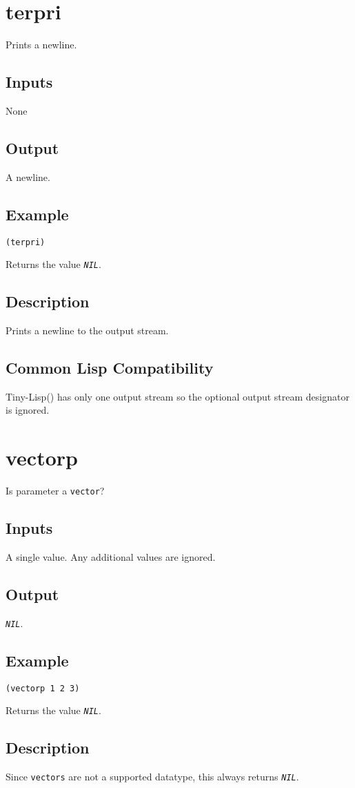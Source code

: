 \documentclass[10pt, openany]{book}
\newcommand{\constant}[1]{\emph{\texttt{#1}}}
\newcommand{\datatype}[1]{\texttt{#1}}
\newcommand{\tl}{Tiny-Lisp}
\begin{document}
\section{terpri}
Prints a newline.
\subsection{Inputs}
None
\subsection{Output}
A newline.
\subsection{Example}
\begin{lstlisting}
(terpri)
\end{lstlisting}
Returns the value \constant{NIL}.
\subsection{Description}
Prints a newline to the output stream.
\subsection{Common Lisp Compatibility}
\tl() has only one output stream so the optional output stream designator is ignored.

\section{vectorp}
Is parameter a \datatype{vector}?
\subsection{Inputs}
A single value.  Any additional values are ignored.
\subsection{Output}
\constant{NIL}.
\subsection{Example}
\begin{lstlisting}
(vectorp 1 2 3)
\end{lstlisting}
Returns the value \constant{NIL}.
\subsection{Description}
Since \datatype{vectors} are not a supported datatype, this always returns \constant{NIL}.
\end{document}
